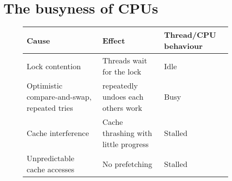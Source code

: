 \chapter{The busyness of CPUs}
\label{chap:busyness}





\begin{figure}
\centering
\begin{tabular}{|p{4cm}|p{4cm}|p{3cm}|}
\hline
Cause & Effect & Thread/CPU behaviour \\
\hline
\hline
Lock contention & Threads wait for the lock & Idle \\
\hline
Optimistic compare-and-swap, repeated tries & repeatedly undoes each others work
& Busy \\
\hline
Cache interference & Cache thrashing with little progress & Stalled \\
\hline
Unpredictable cache accesses & No prefetching & Stalled \\
\hline
\end{tabular}
	\caption{}
	\label{table:timewaste}
\end{figure}

